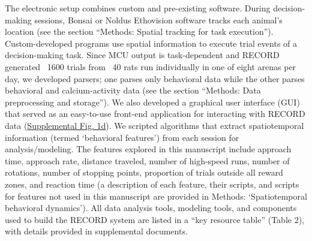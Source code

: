 \documentclass{article}
\begin{document}
\label{fig:Record_main_1}

\vspace{1em}

The electronic setup combines custom and pre-existing software. During decision-making sessions, Bonsai or Noldus Ethovision software tracks each animal’s location (see the section “Methods: Spatial tracking for task execution”). Custom-developed programs use spatial information to execute trial events of a decision-making task. Since MCU output is task-dependent and RECORD generated ~1600 trials from ~40 rats run individually in one of eight arenas per day, we developed parsers; one parses only behavioral data while the other parses behavioral and calcium-activity data (see the section “Methods: Data preprocessing and storage”). We also developed a graphical user interface (GUI) that served as an easy-to-use front-end application for interacting with RECORD data (\hyperref[fig:Record_SI_1]{Supplemental Fig. 1d}). We scripted algorithms that extract spatiotemporal information (termed ‘behavioral features’) from each session for analysis/modeling. The features explored in this manuscript include approach time, approach rate, distance traveled, number of high-speed runs, number of rotations, number of stopping points, proportion of trials outside all reward zones, and reaction time (a description of each feature, their scripts, and scripts for features not used in this manuscript are provided in Methods: ‘Spatiotemporal behavioral dynamics’). All data analysis tools, modeling tools, and components used to build the RECORD system are listed in a “key resource table” (Table 2), with details provided in supplemental documents.

\vspace{1em}
\end{document}
